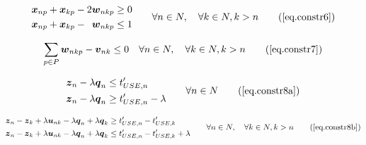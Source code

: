 \begin{equation}
    \begin{split}
        \begin{alignedat}{3}
            \boldsymbol{x}_{np} & {}+{} & \boldsymbol{x}_{kp} & {}-{} & 2 
            \boldsymbol{w}_{nkp} & \ge 0\\
            \boldsymbol{x}_{np} & {}+{} & \boldsymbol{x}_{kp} & {}-{} &
            \boldsymbol{w}_{nkp} & \le 1\\
        \end{alignedat}
    \end{split}
    \quad\quad
    \begin{split}
        \forall n \in N, \quad \forall k \in N, k > n
    \end{split}
    \tag{\ref{eq.constr6}}
\end{equation}

\begin{equation}
    \sum_{p \in P} \boldsymbol{w}_{nkp} - \boldsymbol{v}_{nk} \le 0 \quad
    \forall n \in N, \quad \forall k \in N, k > n
    \tag{\ref{eq.constr7}}
\end{equation}

\begin{equation}
    \begin{split}
        \begin{alignedat}{2}
            \boldsymbol{z}_{n} & {}-{} & \lambda \boldsymbol{q}_{n} & \le 
            t_{USE,n}^{\prime}\\
            \boldsymbol{z}_{n} & {}-{} & \lambda \boldsymbol{q}_{n} & \ge 
            t_{USE,n}^{\prime} - \lambda
        \end{alignedat}
    \end{split}
    \quad\quad
    \begin{split}
        \forall n \in N
    \end{split}
    \tag{\ref{eq.constr8a}}
\end{equation}

\begin{equation}
    \begin{split}
        \boldsymbol{z}_{n} - \boldsymbol{z}_{k} + \lambda \boldsymbol{u}_{nk}
        - \lambda \boldsymbol{q}_{n} + \lambda \boldsymbol{q}_{k} &\ge 
        t_{USE,n}^{\prime} - t_{USE,k}^{\prime}\\
        \boldsymbol{z}_{n} - \boldsymbol{z}_{k} + \lambda \boldsymbol{u}_{nk}
        - \lambda \boldsymbol{q}_{n} + \lambda \boldsymbol{q}_{k} &\le 
        t_{USE,n}^{\prime} - t_{USE,k}^{\prime} + \lambda
    \end{split}
    \quad \quad \forall n \in N, \quad \forall k \in N, k > n
    \tag{\ref{eq.constr8b}}
\end{equation}

